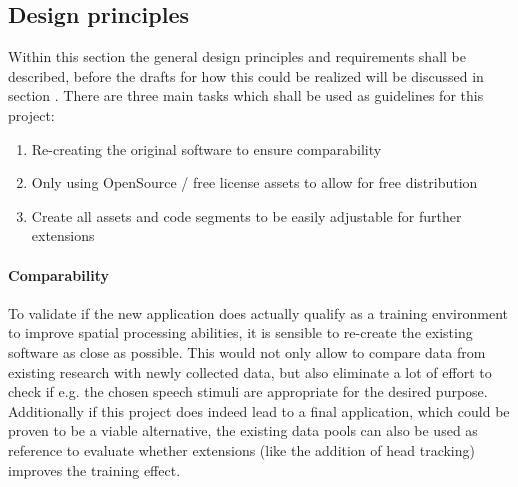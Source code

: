 \documentclass[a4paper,11pt]{article}%
\renewcommand{\\}{\vspace*{0.5\baselineskip} \newline}
\begin{document}
\subsection{Design principles}
Within this section the general design principles and requirements shall be described, before the drafts for how this could be realized will be discussed in section .
\newline
\newline
There are three main tasks which shall be used as guidelines for this project:
\begin{enumerate}
\item Re-creating the original software to ensure comparability
\item Only using OpenSource / free license assets to allow for free distribution
\item Create all assets and code segments to be easily adjustable for further extensions
\end{enumerate}

\paragraph{Comparability} To validate if the new application does actually qualify as a training environment to improve spatial processing abilities, it is sensible to re-create the existing software as close as possible. This would not only allow to compare data from existing research with newly collected data, but also eliminate a lot of effort to check if e.g. the chosen speech stimuli are appropriate for the desired purpose. Additionally if this project does indeed lead to a final application, which could be proven to be a viable alternative, the existing data pools can also be used as reference to evaluate whether extensions (like the addition of head tracking) improves the training effect.
\end{document}

